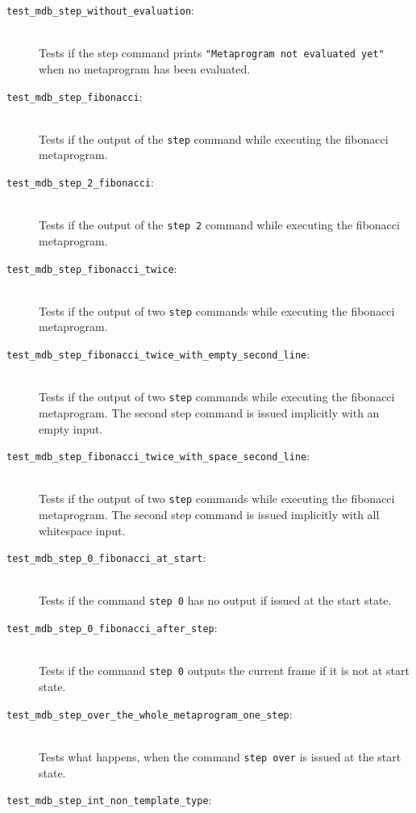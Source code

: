 \begin{description}
    \item[\texttt{test\_mdb\_step\_without\_evaluation}:] \hfill \\
        Tests if the step command prints
        \texttt{"Metaprogram not evaluated yet"} when no metaprogram has been
        evaluated.
    \item[\texttt{test\_mdb\_step\_fibonacci}:] \hfill \\
        Tests if the output of the \texttt{step} command while executing the
        fibonacci metaprogram.
    \item[\texttt{test\_mdb\_step\_2\_fibonacci}:] \hfill \\
        Tests if the output of the \texttt{step 2} command while executing the
        fibonacci metaprogram.
    \item[\texttt{test\_mdb\_step\_fibonacci\_twice}:] \hfill \\
        Tests if the output of two \texttt{step} commands while executing the
        fibonacci metaprogram.
    \item[\texttt{test\_mdb\_step\_fibonacci\_twice\_with\_empty\_second\_line}:] \hfill \\
        Tests if the output of two \texttt{step} commands while executing the
        fibonacci metaprogram. The second step command is issued implicitly
        with an empty input.
    \item[\texttt{test\_mdb\_step\_fibonacci\_twice\_with\_space\_second\_line}:] \hfill \\
        Tests if the output of two \texttt{step} commands while executing the
        fibonacci metaprogram. The second step command is issued implicitly
        with all whitespace input.
    \item[\texttt{test\_mdb\_step\_0\_fibonacci\_at\_start}:] \hfill \\
        Tests if the command \texttt{step 0} has no output if issued at the
        start state.
    \item[\texttt{test\_mdb\_step\_0\_fibonacci\_after\_step}:] \hfill \\
        Tests if the command \texttt{step 0} outputs the current frame if it
        is not at start state.
    \item[\texttt{test\_mdb\_step\_over\_the\_whole\_metaprogram\_one\_step}:] \hfill \\
        Tests what happens, when the command \texttt{step over} is issued at the
        start state.
    \item[\texttt{test\_mdb\_step\_int\_non\_template\_type}:] \hfill \\

\end{description}
